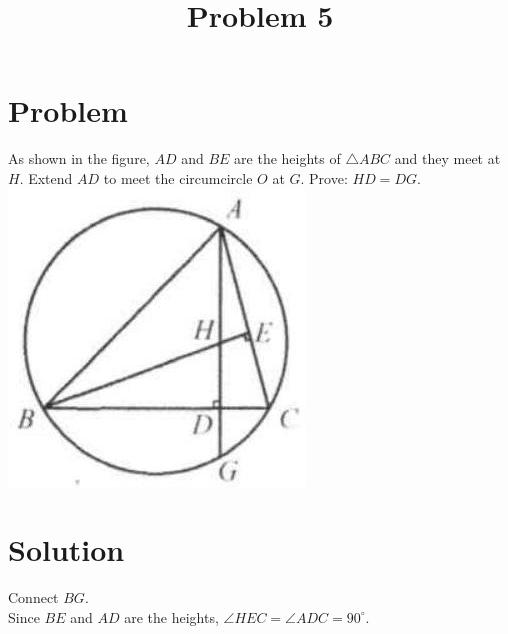 \documentclass{article}
\title{Problem 5}
\date{}
\begin{document}
\maketitle

\section*{Problem}
As shown in the figure, \(A D\) and \(B E\) are the heights of \(\triangle A B C\) and they meet at \(H\). Extend \(A D\) to meet the circumcircle \(O\) at \(G\). Prove: \(H D=D G\).\\
\centering
\includegraphics[width=\textwidth]{images/problem_image_1.jpg}

\section*{Solution}
Connect \(B G\).\\
Since \(B E\) and \(A D\) are the heights, \(\angle H E C=\angle A D C=90^{\circ}\).
\end{document}
